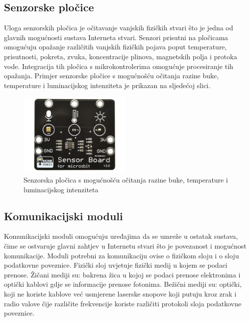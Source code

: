 \documentclass[times, utf8, diplomski]{fer}
\begin{document}
\subsection{Senzorske pločice}
Uloga senzorskih pločica je očitavanje vanjskih fizičkih stvari što je jedna od glavnih mogućnosti sustava Interneta stvari. Senzori prisutni na pločicama omogućuju opažanje različitih vanjskih fizičkih pojava poput temperature, prisutnosti, pokreta, zvuka, koncentracije plinova, magnetskih polja i protoka vode. Integracija tih pločica s mikrokontrolerima omogućuje procesiranje tih opažanja. Primjer senzorske pločice s mogućnošću očitanja razine buke, temperature i luminacijskog intenziteta je prikazan na sljedećoj slici.
\begin{figure}[htb]
    \centering
    \includegraphics[width=5.5cm]{images/sensor_board.jpg}
    \caption{Senzorska pločica s mogućnošću očitanja razine buke, temperature i luminacijskog intenziteta\citep{SensorBoard}}
    \label{fig:sensorboard}
\end{figure}

\subsection{Komunikacijski moduli}
Komunikacijski moduli omogućuju uređajima da se umreže u ostatak sustava, čime se ostvaruje glavni zahtjev u Internetu stvari što je povezanost i mogućnost komunikacije. Moduli potrebni za komunikaciju ovise o fizičkom sloju i o sloju podatkovne poveznice. Fizički sloj uvjetuje fizički medij u kojem se podaci prenose. Žičani mediji su: bakrena žica u kojoj se podaci prenose elektronima i optički kablovi gdje se informacije prenose fotonima. Bežični mediji su: optički, koji ne koriste kablove već usmjerene laserske snopove koji putuju kroz zrak i radio valove čije različite frekvencije koriste različiti protokoli sloja podatkovne poveznice. 
\end{document}
